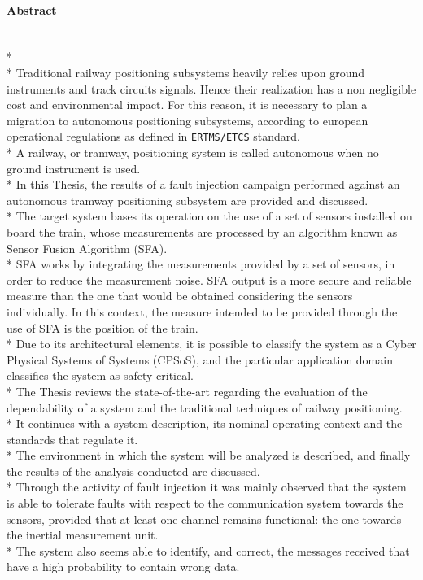 \paragraph{Abstract}\mbox{}\\*\\*
Traditional railway positioning subsystems heavily relies upon ground instruments and track circuits signals. Hence their realization has a non negligible cost and environmental impact. For this reason, it is necessary to plan a migration to autonomous positioning subsystems, according to european operational regulations as defined in \texttt{ERTMS/ETCS} standard.\\*
A railway, or tramway, positioning system is called autonomous when no ground instrument is used.\\*
In this Thesis, the results of a fault injection campaign performed against an autonomous tramway positioning subsystem are provided and discussed.\\*
The target system bases its operation on the use of a set of sensors installed on board the train, whose measurements are processed by an algorithm known as Sensor Fusion Algorithm (SFA).\\*
SFA works by integrating the measurements provided by a set of sensors, in order to reduce the measurement noise. SFA output is a more secure and reliable measure than the one that would be obtained considering the sensors individually. In this context, the measure intended to be provided through the use of SFA is the position of the train.\\*
Due to its architectural elements, it is possible to classify the system as a Cyber Physical Systems of Systems (CPSoS), and the particular application domain classifies the system as safety critical.\\*
The Thesis reviews the state-of-the-art regarding the evaluation of the dependability of a system and the traditional techniques of railway positioning.\\* It continues with a system description, its nominal operating context and the standards that regulate it.\\*
The environment in which the system will be analyzed is described, and finally the results of the analysis conducted are discussed.\\*
Through the activity of fault injection it was mainly observed that the system is able to tolerate faults with respect to the communication system towards the sensors, provided that at least one channel remains functional: the one towards the inertial measurement unit.\\*
The system also seems able to identify, and correct, the messages received that have a high probability to contain wrong data.

